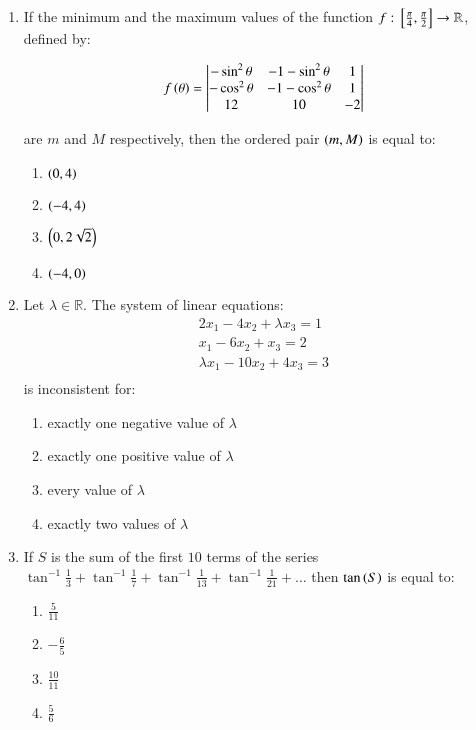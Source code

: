 \documentclass[journal]{IEEEtran}
\begin{document}
\begin{enumerate}
    \item If the minimum and the maximum values of the function $f : {}\left[\frac{\pi}{4}, \frac{\pi}{2}\right] \to \mathbb{R}$, defined by:

    $$
    f\left(\theta\right) = \begin{vmatrix}
    -\sin^2 \theta & -1 - \sin^2 \theta & 1 \\
    -\cos^2 \theta & -1 - \cos^2 \theta & 1 \\
    12 & 10 & -2
    \end{vmatrix}
    $$
    
    are $m$ and $M$ respectively, then the ordered pair $\left(m, M\right)$ is equal to:
    
    \begin{enumerate}
        \item $\left(0, 4\right)$
        \item $\left(-4, 4\right)$
        \item $\left(0, 2\sqrt{2}\right)$
        \item $\left(-4, 0\right)$
    \end{enumerate}
    

    \item Let $\lambda \in \mathbb{R}$. The system of linear equations:
    \begin{align*}
    2x_1 - 4x_2 + \lambda x_3 = 1\\
    x_1 - 6x_2 + x_3 = 2\\
    \lambda x_1 - 10x_2 + 4x_3 = 3\\
    \end{align*}
    is inconsistent for:
    \begin{enumerate}
        \item exactly one negative value of $\lambda$
        \item exactly one positive value of $\lambda$
        \item every value of $\lambda$
        \item exactly two values of $\lambda$
    \end{enumerate}

    \item If $S$ is the sum of the first $10$ terms of the series $\tan^{-1} \frac{1}{3} + \tan^{-1} \frac{1}{7} + \tan^{-1} \frac{1}{13} + \tan^{-1} \frac{1}{21} + \dots$ then $\tan\left(S\right)$ is equal to:
    \begin{enumerate}
        \item $\frac{5}{11}$
        \item $-\frac{6}{5}$
        \item $\frac{10}{11}$
        \item $\frac{5}{6}$
    \end{enumerate}


\end{enumerate}
\end{document}
